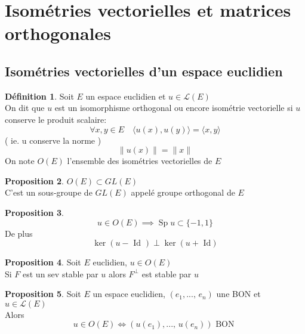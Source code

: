 \documentclass[10pt,a4paper]{article}
\theoremstyle{definition}
\newtheorem{proposition}{Proposition}[section]
\newtheorem{definition}[proposition]{Définition}
\DeclareMathOperator{\Sp}{Sp}
\begin{document}
\section{Isométries vectorielles et matrices orthogonales}
\subsection{Isométries vectorielles d'un espace euclidien}
\begin{definition}
    Soit \(E\) un espace euclidien et \(u \in \mathcal{L}(E)\) \\
    On dit que \(u\) est un isomorphisme orthogonal ou encore isométrie vectorielle si \(u\) conserve le produit scalaire:
    \[\forall x ,y \in E \quad \langle u(x), u(y) \rangle = \langle x, y \rangle\]
    ( ie. u conserve la norme )
    \[\lVert u(x) \rVert  = \lVert x \rVert\]
    On note \(O(E)\) l'ensemble des isométries vectorielles de \(E\)
\end{definition}
\begin{proposition}
    \(O(E) \subset GL(E)\) \\
    C'est un sous-groupe de \(GL(E)\) appelé groupe orthogonal de \(E\)
\end{proposition}
\begin{proposition}
    \[\boxed{u \in O(E) \implies \Sp u \subset \{-1, 1\}}\]
    De plus
    \[\boxed{\ker(u - \text{ Id }) \perp \ker(u + \text{ Id})}\]
\end{proposition}
\begin{proposition}
    Soit \(E\) euclidien, \(u \in O(E)\) \\
    Si \(F\) est un sev stable par \(u\) alors \(F^\perp\) est stable par \(u\)
\end{proposition}
\begin{proposition}
    Soit \(E\) un espace euclidien, \((e_1, ...,\, e_n)\) une BON et \(u \in \mathcal{L}(E)\) \\
    Alors \[\boxed{u \in O(E) \iff (u(e_1), ...,\, u(e_n)) \text{ BON }}\]
\end{proposition}
\end{document}
